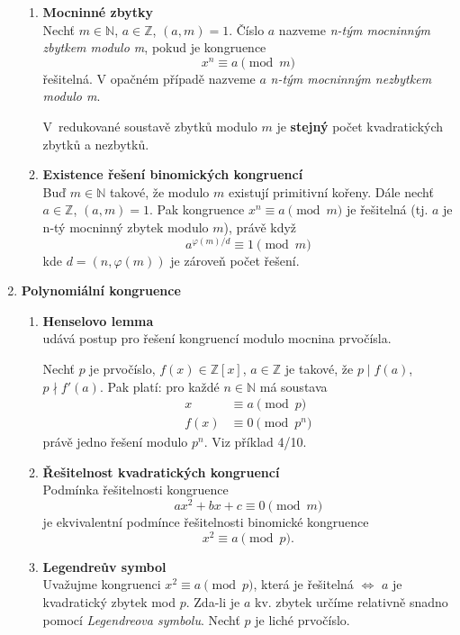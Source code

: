 \documentclass[12pt,a4paper]{article}
\begin{document}
\begin{enumerate}[leftmargin=*]
		\begin{enumerate}
			\item \textbf{Mocninné zbytky}\\
			Nechť $m \in \mathbb{N}$, $a \in \mathbb{Z}$, $(a,m) = 1$. Číslo $a$
			nazveme \textit{n-tým mocninným zbytkem modulo m}, pokud je kongruence
			\[ x^n \equiv a \pmod{m} \]
			řešitelná. V opačném případě nazveme $a$ \textit{n-tým mocninným
				nezbytkem modulo m}.
			
			V~redukované soustavě zbytků modulo $m$ je \textbf{stejný} počet
			kvadratických zbytků a nezbytků.
			
			\item \textbf{Existence řešení binomických kongruencí}\\
			Buď $m \in \mathbb{N}$ takové, že modulo $m$ existují primitivní
			kořeny.  Dále nechť $a \in \mathbb{Z}$, $(a,m) = 1$. Pak kongruence
			$x^n \equiv a \pmod{m}$ je řešitelná (tj. $a$ je n-tý mocninný
			zbytek modulo $m$), právě když
			\[ a^{\varphi(m)/d} \equiv 1 \pmod{m} \]
			kde $d = (n, \varphi(m))$ je zároveň počet řešení.
		\end{enumerate}
		
		\item \textbf{Polynomiální kongruence}
		\begin{enumerate}
			\item \textbf{Henselovo lemma}\\
			udává postup pro řešení kongruencí modulo mocnina
			prvočísla.
			
			Nechť $p$ je prvočíslo, $f(x) \in \mathbb{Z}[x]$, $a \in
			\mathbb{Z}$ je takové, že $p \mid f(a)$, $p \nmid f'(a)$. Pak
			platí: pro každé $n \in \mathbb{N}$ má soustava
			\begin{align*}
			x &\equiv a \pmod{p}\\
			f(x) &\equiv 0 \pmod{p^n}
			\end{align*}
			právě jedno řešení modulo $p^n$. Viz příklad 4/10.
			
			\item \textbf{Řešitelnost kvadratických kongruencí}\\
			Podmínka řešitelnosti kongruence
			\[ ax^2 + bx + c \equiv 0 \pmod{m} \]
			je ekvivalentní podmínce řešitelnosti binomické kongruence
			\[ x^2 \equiv a \pmod{p}. \]
			
			\item \textbf{Legendreův symbol}\\
			Uvažujme kongruenci $x^2 \equiv a \pmod{p}$, která je řešitelná
			$\Leftrightarrow$ $a$ je kvadratický zbytek mod $p$. Zda-li je
			$a$ kv. zbytek určíme relativně snadno pomocí \textit{Legendreova
				symbolu}.
			Nechť $p$ je liché prvočíslo.
			

\end{enumerate}
\end{enumerate}
\end{document}
